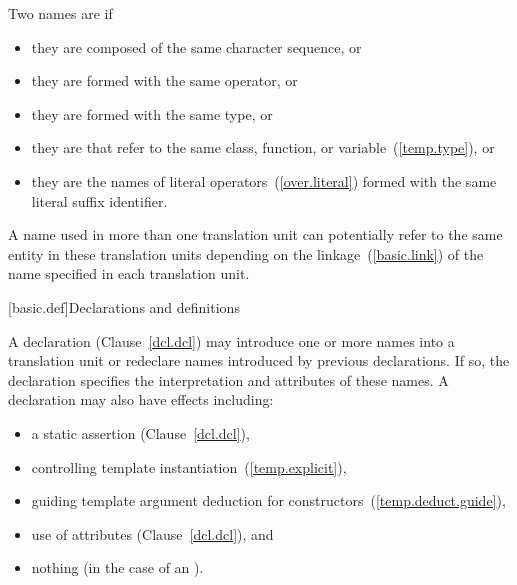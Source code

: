 \pnum
Two names are  if
\begin{itemize}
\item they are  composed of the same character sequence, or
\item they are  formed with
the same operator, or
\item they are  formed
with the same type, or
\item they are  that refer to the same class,
function, or variable~(\ref{temp.type}), or
\item they are the names of literal operators~(\ref{over.literal}) formed with
the same literal suffix identifier.
\end{itemize}

\pnum
{}%
%
A name used in more than one translation unit can potentially
refer to the same entity in these translation units depending on the
linkage~(\ref{basic.link}) of the name specified in each
translation unit.

[basic.def]{Declarations and definitions}

\pnum
{}%
%
%
A declaration (Clause~\ref{dcl.dcl}) may introduce
one or more names into a translation
unit or redeclare names introduced by previous declarations.
If so, the
declaration specifies the interpretation and attributes of these names.
A declaration may also have effects including:
\begin{itemize}
\item a static assertion (Clause~\ref{dcl.dcl}),
\item controlling template instantiation~(\ref{temp.explicit}),
\item guiding template argument deduction for constructors~(\ref{temp.deduct.guide}),
\item use of attributes (Clause~\ref{dcl.dcl}), and
\item nothing (in the case of an ).
\end{itemize}

